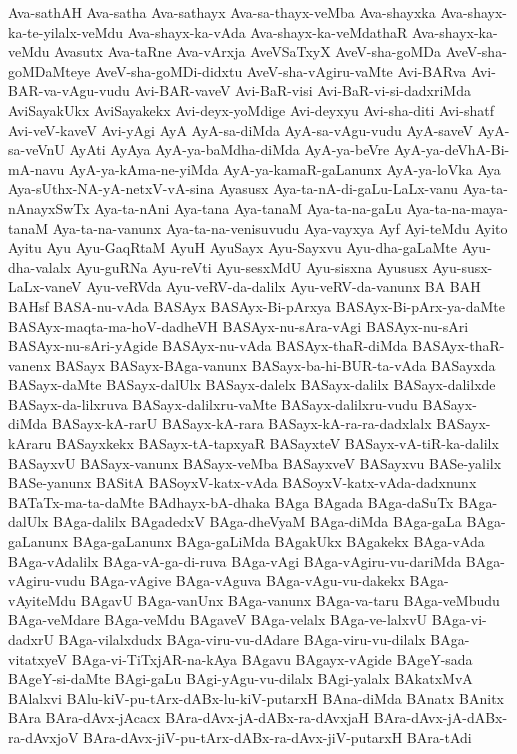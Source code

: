 {Ava-sathAH
Ava-satha
Ava-sathayx
Ava-sa-thayx-veMba
Ava-shayxka
Ava-shayx-ka-te-yilalx-veMdu
Ava-shayx-ka-vAda
Ava-shayx-ka-veMdathaR
Ava-shayx-ka-veMdu
Avasutx
Ava-taRne
Ava-vArxja
AveVSaTxyX
AveV-sha-goMDa
AveV-sha-goMDaMteye
AveV-sha-goMDi-didxtu
AveV-sha-vAgiru-vaMte
Avi-BARva
Avi-BAR-va-vAgu-vudu
Avi-BAR-vaveV
Avi-BaR-visi
Avi-BaR-vi-si-dadxriMda
AviSayakUkx
AviSayakekx
Avi-deyx-yoMdige
Avi-deyxyu
Avi-sha-diti
Avi-shatf
Avi-veV-kaveV
Avi-yAgi
AyA
AyA-sa-diMda
AyA-sa-vAgu-vudu
AyA-saveV
AyA-sa-veVnU
AyAti
AyAya
AyA-ya-baMdha-diMda
AyA-ya-beVre
AyA-ya-deVhA-Bi-mA-navu
AyA-ya-kAma-ne-yiMda
AyA-ya-kamaR-gaLanunx
AyA-ya-loVka
Aya
Aya-sUthx-NA-yA-netxV-vA-sina
Ayasusx
Aya-ta-nA-di-gaLu-LaLx-vanu
Aya-ta-nAnayxSwTx
Aya-ta-nAni
Aya-tana
Aya-tanaM
Aya-ta-na-gaLu
Aya-ta-na-maya-tanaM
Aya-ta-na-vanunx
Aya-ta-na-venisuvudu
Aya-vayxya
Ayf
Ayi-teMdu
Ayito
Ayitu
Ayu
Ayu-GaqRtaM
AyuH
AyuSayx
Ayu-Sayxvu
Ayu-dha-gaLaMte
Ayu-dha-valalx
Ayu-guRNa
Ayu-reVti
Ayu-sesxMdU
Ayu-sisxna
Ayususx
Ayu-susx-LaLx-vaneV
Ayu-veRVda
Ayu-veRV-da-dalilx
Ayu-veRV-da-vanunx
BA
BAH
BAHsf
BASA-nu-vAda
BASAyx
BASAyx-Bi-pArxya
BASAyx-Bi-pArx-ya-daMte
BASAyx-maqta-ma-hoV-dadheVH
BASAyx-nu-sAra-vAgi
BASAyx-nu-sAri
BASAyx-nu-sAri-yAgide
BASAyx-nu-vAda
BASAyx-thaR-diMda
BASAyx-thaR-vanenx
BASayx
BASayx-BAga-vanunx
BASayx-ba-hi-BUR-ta-vAda
BASayxda
BASayx-daMte
BASayx-dalUlx
BASayx-dalelx
BASayx-dalilx
BASayx-dalilxde
BASayx-da-lilxruva
BASayx-dalilxru-vaMte
BASayx-dalilxru-vudu
BASayx-diMda
BASayx-kA-rarU
BASayx-kA-rara
BASayx-kA-ra-ra-dadxlalx
BASayx-kAraru
BASayxkekx
BASayx-tA-tapxyaR
BASayxteV
BASayx-vA-tiR-ka-dalilx
BASayxvU
BASayx-vanunx
BASayx-veMba
BASayxveV
BASayxvu
BASe-yalilx
BASe-yanunx
BASitA
BASoyxV-katx-vAda
BASoyxV-katx-vAda-dadxnunx
BATaTx-ma-ta-daMte
BAdhayx-bA-dhaka
BAga
BAgada
BAga-daSuTx
BAga-dalUlx
BAga-dalilx
BAgadedxV
BAga-dheVyaM
BAga-diMda
BAga-gaLa
BAga-gaLanunx
BAga-gaLanunx
BAga-gaLiMda
BAgakUkx
BAgakekx
BAga-vAda
BAga-vAdalilx
BAga-vA-ga-di-ruva
BAga-vAgi
BAga-vAgiru-vu-dariMda
BAga-vAgiru-vudu
BAga-vAgive
BAga-vAguva
BAga-vAgu-vu-dakekx
BAga-vAyiteMdu
BAgavU
BAga-vanUnx
BAga-vanunx
BAga-va-taru
BAga-veMbudu
BAga-veMdare
BAga-veMdu
BAgaveV
BAga-velalx
BAga-ve-lalxvU
BAga-vi-dadxrU
BAga-vilalxdudx
BAga-viru-vu-dAdare
BAga-viru-vu-dilalx
BAga-vitatxyeV
BAga-vi-TiTxjAR-na-kAya
BAgavu
BAgayx-vAgide
BAgeY-sada
BAgeY-si-daMte
BAgi-gaLu
BAgi-yAgu-vu-dilalx
BAgi-yalalx
BAkatxMvA
BAlalxvi
BAlu-kiV-pu-tArx-dABx-lu-kiV-putarxH
BAna-diMda
BAnatx
BAnitx
BAra
BAra-dAvx-jAcacx
BAra-dAvx-jA-dABx-ra-dAvxjaH
BAra-dAvx-jA-dABx-ra-dAvxjoV
BAra-dAvx-jiV-pu-tArx-dABx-ra-dAvx-jiV-putarxH
BAra-tAdi
}

